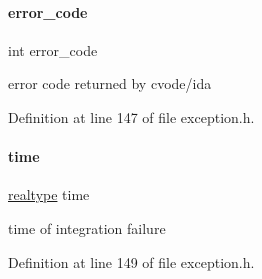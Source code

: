 \paragraph{\texorpdfstring{error\+\_\+code}{error\_code}}
{\footnotesize\ttfamily int error\+\_\+code}

error code returned by cvode/ida 

Definition at line 147 of file exception.\+h.

\mbox{\label{classamici_1_1_integration_failure_a6dcdb92539544d894bdc153b3ba8bea6}} 
\paragraph{\texorpdfstring{time}{time}}
{\footnotesize\ttfamily \mbox{\hyperlink{namespaceamici_a1bdce28051d6a53868f7ccbf5f2c14a3}{realtype}} time}

time of integration failure 

Definition at line 149 of file exception.\+h.

